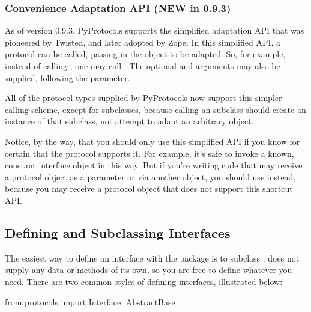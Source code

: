 \begin{verbatim%
}
\begin{verbatim%
}
\subsubsection{Convenience Adaptation API (NEW in 0.9.3)\label{protocols-calling}}

As of version 0.9.3, PyProtocols supports the simplified adaptation API that
was pioneered by Twisted, and later adopted by Zope.  In this simplified API,
a protocol can be called, passing in the object to be adapted.  So, for example,
instead of calling , one may call .  The
optional  and  arguments may also be supplied,
following the  parameter.

All of the protocol types supplied by PyProtocols now support this simpler
calling scheme, except for  subclasses, because calling
an  subclass should create an instance of that subclass,
not attempt to adapt an arbitrary object.

Notice, by the way, that you should only use this simplified API if you know
for certain that the protocol supports it.  For example, it's safe to invoke
a known, constant interface object in this way.  But if you're writing code that
may receive a protocol object as a parameter or via another object, you should
use  instead, because you may receive a protocol object that
does not support this shortcut API.




















\newpage
\subsection{Defining and Subclassing Interfaces \label{protocols-defining}}

The easiest way to define an interface with the  package is
to subclass .   does not supply any
data or methods of its own, so you are free to define whatever you need. There
are two common styles of defining interfaces, illustrated below:

\begin{verbatim%
}from protocols import Interface, AbstractBase


\end{verbatim%
}
\end{verbatim%
}
\end{verbatim%
}
